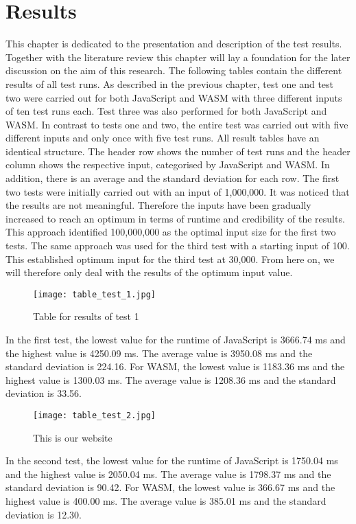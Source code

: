 \newpage
\section{Results} \label{results}
This chapter is dedicated to the presentation and description of the test results. Together with the literature review this chapter will lay a foundation for the later discussion on the aim of this research. The following tables contain the different results of all test runs. As described in the previous chapter, test one and test two were carried out for both JavaScript and WASM with three different inputs of ten test runs each. Test three was also performed for both JavaScript and WASM. In contrast to tests one and two, the entire test was carried out with five different inputs and only once with five test runs.
All result tables have an identical structure. The header row shows the number of test runs and the header column shows the respective input, categorised by JavaScript and WASM. In addition, there is an average and the standard deviation for each row. The first two tests were initially carried out with an input of 1,000,000. It was noticed that the results are not meaningful. Therefore the inputs have been gradually increased to reach an optimum in terms of runtime and credibility of the results. This approach identified 100,000,000 as the optimal input size for the first two tests. The same approach was used for the third test with a starting input of 100. This established optimum input for the third test at 30,000. From here on, we will therefore only deal with the results of the optimum input value.
\begin{figure}[H]
    \centering
    \caption[]{Table for results of test 1}
	\label{fig:tableTest1}
    \texttt{[image: table\_test\_1.jpg]}
\end{figure}
In the first test, the lowest value for the runtime of JavaScript is 3666.74 ms and the highest value is 4250.09 ms. The average value is 3950.08 ms and the standard deviation is 224.16. For WASM, the lowest value is 1183.36 ms and the highest value is 1300.03 ms. The average value is 1208.36 ms and the standard deviation is 33.56.
\begin{figure}[H]
    \centering
    \caption[]{This is our website}
	\label{fig:tableTest2}
    \texttt{[image: table\_test\_2.jpg]}
\end{figure}
In the second test, the lowest value for the runtime of JavaScript is 1750.04 ms and the highest value is 2050.04 ms. The average value is 1798.37 ms and the standard deviation is 90.42. For WASM, the lowest value is 366.67 ms and the highest value is 400.00 ms. The average value is 385.01 ms and the standard deviation is 12.30.
